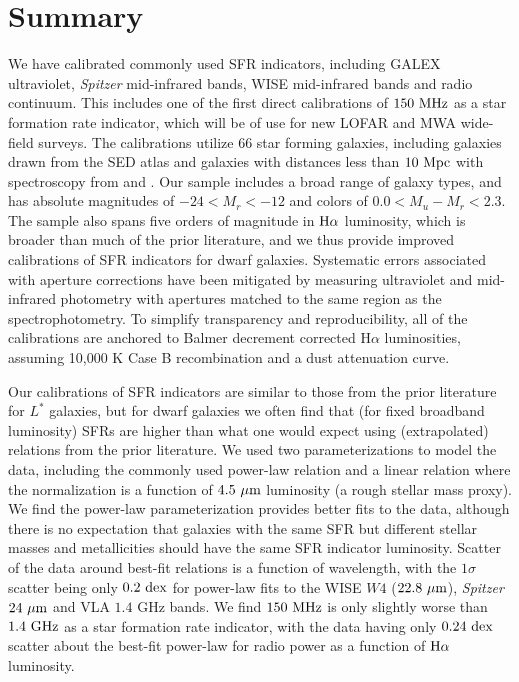 \documentclass[preprint]{aastex61}
\begin{document}
\section{Summary}
\label{sec:summary}

We have calibrated commonly used SFR indicators, including GALEX ultraviolet, {\it Spitzer} mid-infrared bands, WISE mid-infrared bands and radio continuum. This includes one of the first direct calibrations of $150~{\rm MHz}$ as a star formation rate indicator, which will be of use for new LOFAR and MWA wide-field surveys. The calibrations utilize 66 star forming galaxies, including galaxies drawn from the \citet{bro14} SED atlas and galaxies with distances less than $10~{\rm Mpc}$ with spectroscopy from \citet{mou06} and \citet{mou10}. Our sample includes a broad range of galaxy types, and has absolute magnitudes of $-24<M_r<-12$ and colors of $0.0<M_u-M_r<2.3$. The sample also spans five orders of magnitude in ${\rm H\alpha}$ luminosity, which is broader than much of the prior literature, and we thus provide improved calibrations of SFR indicators for dwarf galaxies. Systematic errors associated with aperture corrections have been mitigated by measuring ultraviolet and mid-infrared photometry with apertures matched to the same region as the spectrophotometry. To simplify transparency and reproducibility, all of the calibrations are anchored to Balmer decrement corrected H$\alpha$ luminosities, assuming 10,000 K Case B recombination and a \citet{fit99} dust attenuation curve. 

Our calibrations of SFR indicators are similar to those from the prior literature for $L^*$ galaxies, but for dwarf galaxies we often find that (for fixed broadband luminosity) SFRs are higher than what one would expect using (extrapolated) relations from the prior literature. We used two parameterizations to model the data, including the commonly used power-law relation and a linear relation where the normalization is a function of $4.5~{\rm \mu m}$ luminosity (a rough stellar mass proxy). We find the power-law parameterization provides better fits to the data, although there is no expectation that galaxies with the same SFR but different stellar masses and metallicities should have the same SFR indicator luminosity. Scatter of the data around best-fit relations is a function of wavelength, with the $1\sigma$ scatter being only $0.2~{\rm dex}$ for power-law fits to the WISE $W4$ ($22.8~{\rm \mu m}$), {\it Spitzer} $24~{\rm \mu m}$ and VLA $1.4$ GHz bands. We find $150~{\rm MHz}$ is only slightly worse than $1.4~{\rm GHz}$ as a star formation rate indicator, with the data having only $0.24~{\rm dex}$ scatter about the best-fit power-law for radio power as a function of ${\rm H\alpha}$ luminosity.
\end{document}
